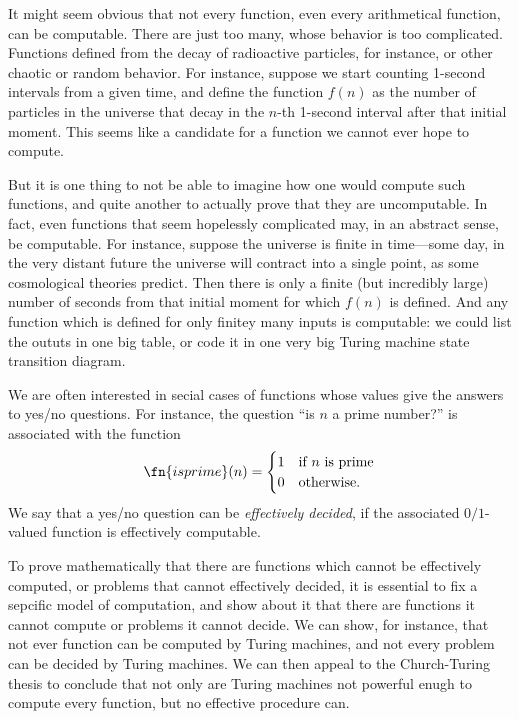 \documentclass[../../../include/open-logic-section]{subfiles}
\begin{document}

It might seem obvious that not every function, even every arithmetical
function, can be computable. There are just too many, whose behavior
is too complicated.  Functions defined from the decay of radioactive
particles, for instance, or other chaotic or random behavior. For
instance, suppose we start counting 1-second intervals from a given
time, and define the function $f(n)$ as the number of particles in the
universe that decay in the $n$-th 1-second interval after that initial
moment.  This seems like a candidate for a function we cannot ever hope
to compute.

But it is one thing to not be able to imagine how one would compute
such functions, and quite another to actually prove that they are
uncomputable.  In fact, even functions that seem hopelessly
complicated may, in an abstract sense, be computable.  For instance,
suppose the universe is finite in time---some day, in the very distant
future the universe will contract into a single point, as some
cosmological theories predict. Then there is only a finite (but
incredibly large) number of seconds from that initial moment for which
$f(n)$ is defined.  And any function which is defined for only finitey
many inputs is computable: we could list the oututs in one big table,
or code it in one very big Turing machine state transition diagram.

We are often interested in secial cases of functions whose values give
the answers to yes/no questions.  For instance, the question ``is $n$
a prime number?'' is associated with the function
\[
\fn{isprime}(n) = \begin{cases}
  1 & \text{if $n$ is prime}\\
  0 & \text{otherwise.}
  \end{cases}
\]
We say that a yes/no question can be \emph{effectively decided}, if
the associated $0/1$-valued function is effectively computable.

To prove mathematically that there are functions which cannot be
effectively computed, or problems that cannot effectively decided, it
is essential to fix a sepcific model of computation, and show about it
that there are functions it cannot compute or problems it cannot
decide.  We can show, for instance, that not ever function can be
computed by Turing machines, and not every problem can be decided by
Turing machines.  We can then appeal to the Church-Turing thesis to
conclude that not only are Turing machines not powerful enugh to
compute every function, but no effective procedure can.
\end{document}
